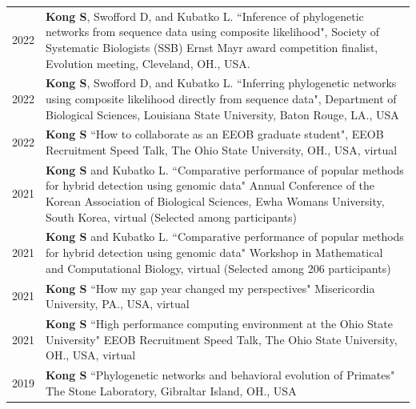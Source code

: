 \documentclass[11pt]{article}
\begin{document}
\begin{longtable}{p{}  p{}}



2022 & \textbf{Kong S}, Swofford D, and Kubatko L. ``Inference of phylogenetic networks from sequence data using composite likelihood",  Society of Systematic Biologists (SSB) Ernst Mayr award competition finalist, Evolution meeting, Cleveland, OH., USA.\vspace{5pt}\\

2022 & \textbf{Kong S}, Swofford D, and Kubatko L. ``Inferring phylogenetic networks using composite likelihood directly from sequence data", Department of Biological Sciences, Louisiana State University, Baton Rouge, LA., USA\vspace{5pt}\\

2022 & \textbf{Kong S} ``How to collaborate as an EEOB graduate student", EEOB Recruitment Speed Talk, The Ohio State University, OH., USA, virtual \vspace{5pt} \\ 

2021 & \textbf{Kong S} and Kubatko L.  ``Comparative performance of popular methods for hybrid detection using genomic data" Annual Conference of the Korean Association of Biological Sciences, Ewha Womans University, South Korea, virtual (Selected among participants)\vspace{5pt}\\

2021 & \textbf{Kong S} and Kubatko L.  ``Comparative performance of popular methods for hybrid detection using genomic data" Workshop in Mathematical and Computational Biology, virtual (Selected among 206 participants)\textit{}  \\ 

2021 & \textbf{Kong S} ``How my gap year changed my perspectives" Misericordia University, PA., USA, virtual \vspace{5pt} \\  

2021 & \textbf{Kong S} ``High performance computing environment at the Ohio State University" EEOB Recruitment Speed Talk, The Ohio State University, OH., USA, virtual \vspace{5pt} \\ 

2019 &  \textbf{Kong S} ``Phylogenetic networks and behavioral evolution of Primates" The Stone Laboratory, Gibraltar Island, OH., USA \vspace{5pt} \\ 


\end{longtable}
\end{document}
